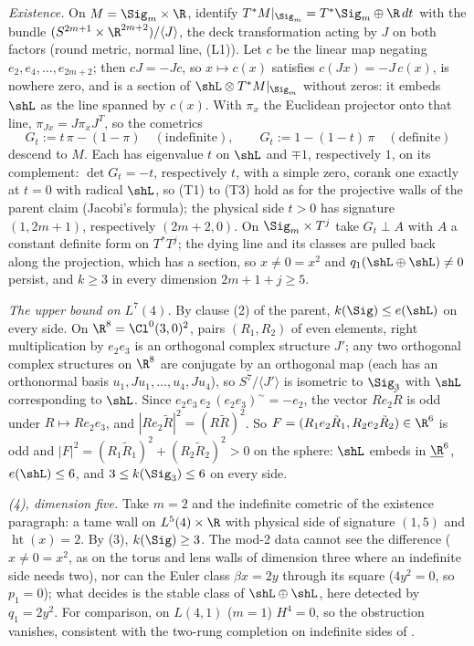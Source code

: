 \emph{Existence.} On $M = \Sig_{m} \times \R$, identify $T^{*}M|_{\Sig_{m}} = T^{*}\Sig_{m} \oplus \R\,dt$ with the bundle $(S^{2m+1} \times \R^{2m+2})/\langle J \rangle$, the deck transformation acting by $J$ on both factors (round metric, normal line, (L1)). Let $c$ be the linear map negating $e_{2}, e_{4}, \dots, e_{2m+2}$; then $cJ = -Jc$, so $x \mapsto c(x)$ satisfies $c(Jx) = -J\,c(x)$, is nowhere zero, and is a section of $\shL \otimes T^{*}M|_{\Sig_{m}}$ without zeros: it embeds $\shL$ as the line spanned by $c(x)$. With $\pi_{x}$ the Euclidean projector onto that line, $\pi_{Jx} = J \pi_{x} J^{T}$, so the cometrics
\[
G_{t} := t\,\pi - (1 - \pi) \quad (\text{indefinite}), \qquad G_{t} := 1 - (1 - t)\,\pi \quad (\text{definite})
\]
descend to $M$. Each has eigenvalue $t$ on $\shL$ and $\mp 1$, respectively $1$, on its complement: $\det G_{t} = -t$, respectively $t$, with a simple zero, corank one exactly at $t = 0$ with radical $\shL$, so (T1) to (T3) hold as for the projective walls of the parent claim (Jacobi's formula); the physical side $t > 0$ has signature $(1, 2m+1)$, respectively $(2m+2, 0)$. On $\Sig_{m} \times T^{j}$ take $G_{t} \perp A$ with $A$ a constant definite form on $T^{*}T^{j}$; the dying line and its classes are pulled back along the projection, which has a section, so $x \neq 0 = x^{2}$ and $q_{1}(\shL \oplus \shL) \neq 0$ persist, and $k \geq 3$ in every dimension $2m+1+j \geq 5$.

\emph{The upper bound on $L^{7}(4)$.} By clause (2) of the parent, $k(\Sig) \le e(\shL)$ on every side. On $\R^{8} = \Cl^{0}(3,0)^{2}$, pairs $(R_{1}, R_{2})$ of even elements, right multiplication by $e_{2}e_{3}$ is an orthogonal complex structure $J'$; any two orthogonal complex structures on $\R^{8}$ are conjugate by an orthogonal map (each has an orthonormal basis $u_{1}, J u_{1}, \dots, u_{4}, J u_{4}$), so $S^{7}/\langle J' \rangle$ is isometric to $\Sig_{3}$ with $\shL$ corresponding to $\shL$. Since $e_{2}e_{3}\, e_{2}\, (e_{2}e_{3})^{\sim} = -e_{2}$, the vector $R e_{2} \tilde R$ is odd under $R \mapsto R e_{2}e_{3}$, and $|R e_{2}\tilde R|^{2} = (R\tilde R)^{2}$. So $F = (R_{1}e_{2}\tilde R_{1}, R_{2} e_{2} \tilde R_{2}) \in \R^{6}$ is odd and $|F|^{2} = (R_{1}\tilde R_{1})^{2} + (R_{2}\tilde R_{2})^{2} > 0$ on the sphere: $\shL$ embeds in $\underline{\R}^{6}$, $e(\shL) \le 6$, and $3 \le k(\Sig_{3}) \le 6$ on every side.

\emph{(4), dimension five.} Take $m = 2$ and the indefinite cometric of the existence paragraph: a tame wall on $L^{5}(4) \times \R$ with physical side of signature $(1,5)$ and $\operatorname{ht}(x) = 2$. By (3), $k(\Sig) \geq 3$. The mod-2 data cannot see the difference ($x \neq 0 = x^{2}$, as on the torus and lens walls of dimension three where an indefinite side needs two), nor can the Euler class $\beta x = 2y$ through its square ($4y^{2} = 0$, so $p_{1} = 0$); what decides is the stable class of $\shL \oplus \shL$, here detected by $q_{1} = 2y^{2}$. For comparison, on $L(4,1)$ ($m = 1$) $H^{4} = 0$, so the obstruction vanishes, consistent with the two-rung completion on indefinite sides of .

